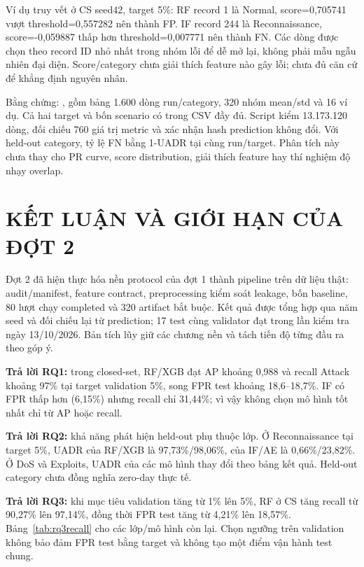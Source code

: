 \documentclass[12pt,a4paper,oneside]{report}
\begin{document}
Ví dụ truy vết ở CS seed42, target 5\%: RF record 1 là Normal, score=0,705741 vượt threshold=0,557282 nên thành FP. IF record 244 là Reconnaissance, score=-0,059887 thấp hơn threshold=0,007771 nên thành FN. Các dòng được chọn theo record ID nhỏ nhất trong nhóm lỗi để dễ mở lại, không phải mẫu ngẫu nhiên đại diện. Score/category chưa giải thích feature nào gây lỗi; chưa đủ căn cứ để khẳng định nguyên nhân.

Bằng chứng: , gồm bảng 1.600 dòng run/category, 320 nhóm mean/std và 16 ví dụ. Cả hai target và bốn scenario có trong CSV đầy đủ. Script  kiểm 13.173.120 dòng, đối chiếu 760 giá trị metric và xác nhận hash prediction không đổi. Với held-out category, tỷ lệ FN bằng 1-UADR tại cùng run/target. Phân tích này chưa thay cho PR curve, score distribution, giải thích feature hay thí nghiệm độ nhạy overlap.

\chapter{KẾT LUẬN VÀ GIỚI HẠN CỦA ĐỢT 2}
Đợt 2 đã hiện thực hóa nền protocol của đợt 1 thành pipeline trên dữ liệu thật: audit/manifest, feature contract, preprocessing kiểm soát leakage, bốn baseline, 80 lượt chạy completed và 320 artifact bắt buộc. Kết quả được tổng hợp qua năm seed và đối chiếu lại từ prediction; 17 test cùng validator đạt trong lần kiểm tra ngày 13/10/2026. Bản tích lũy giữ các chương nền và tách tiến độ từng đầu ra theo góp ý.

\textbf{Trả lời RQ1:} trong closed-set, RF/XGB đạt AP khoảng 0,988 và recall Attack khoảng 97\% tại target validation 5\%, song FPR test khoảng 18,6--18,7\%. IF có FPR thấp hơn (6,15\%) nhưng recall chỉ 31,44\%; vì vậy không chọn mô hình tốt nhất chỉ từ AP hoặc recall.

\textbf{Trả lời RQ2:} khả năng phát hiện held-out phụ thuộc lớp. Ở Reconnaissance tại target 5\%, UADR của RF/XGB là 97,73\%/98,06\%, của IF/AE là 0,66\%/23,82\%. Ở DoS và Exploits, UADR của các mô hình thay đổi theo bảng kết quả. Held-out category chưa đồng nghĩa zero-day thực tế.

\textbf{Trả lời RQ3:} khi mục tiêu validation tăng từ 1\% lên 5\%, RF ở CS tăng recall từ 90,27\% lên 97,14\%, đồng thời FPR test tăng từ 4,21\% lên 18,57\%. Bảng~\ref{tab:rq3recall} cho các lớp/mô hình còn lại. Chọn ngưỡng trên validation không bảo đảm FPR test bằng target và không tạo một điểm vận hành test chung.
\end{document}
